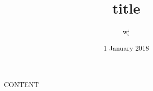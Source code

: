 \documentclass[12pt]{beamer}
\begin{document}
\title{title}
\author{wj}
\date{1 January 2018}
\maketitle

CONTENT
\end{document}
